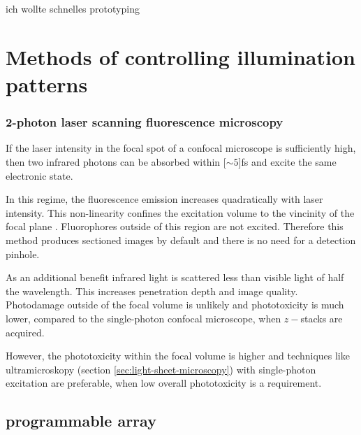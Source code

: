 \documentclass[oneside,a4paper,12pt,BCOR20mm,DIV14]{scrbook} %
\begin{document}
ich wollte schnelles prototyping




\chapter{Methods of controlling illumination patterns}
\label{sec:illum-patterns}
\subsection{2-photon laser scanning fluorescence microscopy}
\label{sec:2-photon}
If the laser intensity in the focal spot of a confocal microscope is
sufficiently high, then two infrared photons can be absorbed within
\unit[$\sim 5$]{fs} and excite the same electronic state.

In this regime, the fluorescence emission increases quadratically with
laser intensity. This non-linearity confines the excitation volume to
the vincinity of the focal plane \citep{Denk1990}. Fluorophores
outside of this region are not excited. Therefore this method produces
sectioned images by default and there is no need for a detection
pinhole.

As an additional benefit infrared light is scattered less than visible
light of half the wavelength. This increases penetration depth and
image quality. Photodamage outside of the focal volume is unlikely and
phototoxicity is much lower, compared to the single-photon confocal
microscope, when $z-$stacks are acquired.

However, the phototoxicity within the focal volume is higher and
techniques like ultramicroskopy (section
\ref{sec:light-sheet-microscopy}) with single-photon excitation are
preferable, when low overall phototoxicity is a requirement.

\section{programmable array}
\cite{Caarls2011}



%
%
\end{document}
